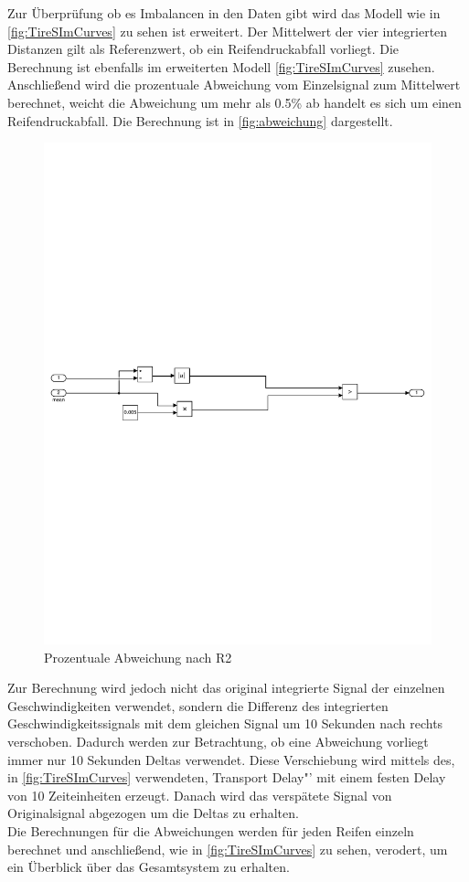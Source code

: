 Zur Überprüfung ob es Imbalancen in den Daten gibt wird das Modell wie in \autoref{fig:TireSImCurves} zu sehen ist erweitert.
Der Mittelwert der vier integrierten Distanzen gilt als Referenzwert, ob ein Reifendruckabfall vorliegt. Die Berechnung ist ebenfalls im erweiterten Modell \autoref{fig:TireSImCurves} zusehen. Anschließend wird die prozentuale Abweichung vom Einzelsignal zum Mittelwert berechnet, weicht die Abweichung um mehr als 0.5\% ab handelt es sich um einen Reifendruckabfall. Die Berechnung ist in \autoref{fig:abweichung} dargestellt. \\
\begin{figure}[h!]
	\centering
	\includegraphics[width=1\linewidth]{../Graphiken/PDFSplit/3_PDFsam_SebastianTireSim2.pdf}
	\caption{Prozentuale Abweichung nach R2}
	\label{fig:abweichung}
\end{figure}
Zur Berechnung wird jedoch nicht das original integrierte Signal der einzelnen Geschwindigkeiten verwendet, sondern die Differenz des integrierten Geschwindigkeitssignals mit dem gleichen Signal um 10 Sekunden nach rechts verschoben. Dadurch werden zur Betrachtung, ob eine Abweichung vorliegt immer nur 10 Sekunden Deltas verwendet. Diese Verschiebung wird mittels des, in \autoref{fig:TireSImCurves} verwendeten, \glqq Transport Delay"' mit einem festen Delay von 10 Zeiteinheiten erzeugt. Danach wird das verspätete Signal von Originalsignal abgezogen um die Deltas zu erhalten.\\
Die Berechnungen für die Abweichungen werden für jeden Reifen einzeln berechnet und anschließend, wie in \autoref{fig:TireSImCurves} zu sehen, verodert, um ein Überblick über das Gesamtsystem zu erhalten.\\

